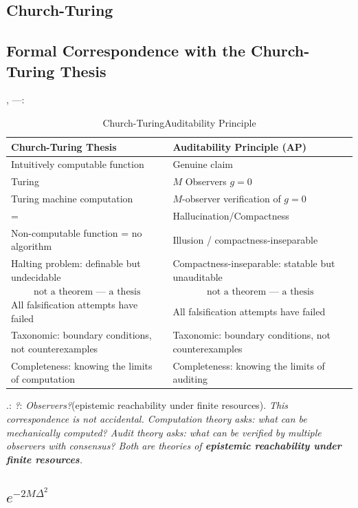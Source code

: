 \documentclass[12pt,a4paper]{article}
\theoremstyle{plain}
\theoremstyle{definition}
\theoremstyle{remark}
\begin{document}
\subsection{Church-Turing}
\subsection{Formal Correspondence with the Church-Turing Thesis}
, ---: 
\vspace{6pt}
\begin{table}[H]
\centering
\begin{tabular}{p{} p{}}
\toprule
\textbf{Church-Turing Thesis} & \textbf{Auditability Principle (AP)} \\
\midrule
Intuitively computable function & Genuine claim \\
\midrule
Turing & $M$ Observers $g=0$ \\
Turing machine computation & $M$-observer verification of $g=0$ \\
\midrule
 = & Hallucination/Compactness \\
Non-computable function = no algorithm & Illusion / compactness-inseparable \\
\midrule
Halting problem: definable but undecidable & Compactness-inseparable: statable but unauditable \\
\midrule
$$\text{not a theorem --- a thesis}$$ & $$\text{not a theorem --- a thesis}$$ \\
\midrule
All falsification attempts have failed & All falsification attempts have failed \\
\midrule
Taxonomic: boundary conditions, not counterexamples & Taxonomic: boundary conditions, not counterexamples \\
\midrule
Completeness: knowing the limits of computation & Completeness: knowing the limits of auditing \\
\bottomrule
\end{tabular}
\caption{Church-TuringAuditability Principle}
\end{table}
\vspace{6pt}
\noindent
.: \textit{?}: \textit{Observers?}(epistemic reachability under finite resources).
\vspace{4pt}
\noindent
\textit{This correspondence is not accidental. Computation theory asks: what can be mechanically computed? Audit theory asks: what can be verified by multiple observers with consensus? Both are theories of \textbf{epistemic reachability under finite resources}.}
\subsection{$e^{-2M\Delta^2}$ }
\end{document}

